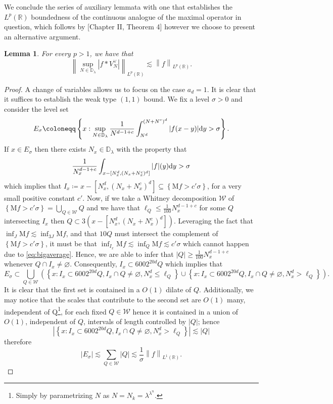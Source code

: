 \documentclass[12pt,leqno]{amsart}
\def\d{{\rm d}}
\def\R {\mathbb{R}}
\newcounter{counter}
\newcounter{counter2}
\numberwithin{equation}{section}
\numberwithin{counter2}{section}
\newcounter{theorem}
\newtheorem{lemma}[subsection]{Lemma}
\theoremstyle{definition}
\theoremstyle{plain}
\begin{document}
	We conclude the series of auxiliary lemmata with one that establishes the $L^p(\R)$ boundedness of the continuous analogue  of the maximal operator in question, which follows by \cite{SteinRealVariableMethods}[Chapter II, Theorem 4] however we choose to present an alternative argument.
	\begin{lemma} \label{l:maxfunctionvariant} For every $p>1$, we have that 
		\[ \left \|  \sup_{N \in \mathbb{D}_{\lambda}} |f* V_N^{\vee}|  \right \|_{L^{p}(\R)} \lesssim \left \| f \right \|_{L^p(\R)}. \] 
	\end{lemma}
	\begin{proof}
		A change of variables allows us to focus on the case $a_d=1.$	It is clear that it suffices to establish the weak type $(1,1)$ bound. We fix a level $\sigma>0$ and consider the level set \[ E_{\sigma} \coloneqq \left\{x : \sup_{N \in \mathbb{D}_{\lambda}} \frac{1}{N^{d-1+c}}\int_{N^d}^{(N+N^c)^d}|f(x-y)| \d y > \sigma   \right\}. \]  If $x \in E_{\sigma}$ then there exists $N_x \in \mathbb{D}_{\lambda}$ with the property that  \begin{equation} \label{eq:bigaverage}
			\frac{1}{N_x^{d-1+c}} \int_{x-[N_x^d,(N_{x}+N_x^{c})^d]}|f|(y) \d y > \sigma
		\end{equation} which implies that $I_x \coloneqq x-[N_x^d,(N_x+N_x^c)^{d}] \subseteq \left\{\mathrm{M}f > c' \sigma \right\}$, for a very small positive constant $c'.$ Now, if we take a Whitney decomposition $\mathcal{W}$ of $\left\{\mathrm{M}f > c'  \sigma\right\}=\bigcup_{Q \in \mathcal{W}}Q$  and we have that $ \ell_Q \leq \frac{1}{100}  N_x^{d-1+c} $ for some $Q  $ intersecting $I_x$ then $Q \subset 3 \left(x-[N_x^d,(N_x+N_x^c)^{d}] \right) $. Leveraging the fact that $\inf_J \mathrm{M}f \lesssim \inf_{3J} \mathrm{M}f$, and that $10Q$ must intersect the complement of $\left\{ \mathrm{M}f >c' \sigma \right\}$, it must be that $ \inf_{I_x} \mathrm{M}f  \lesssim  \inf_Q  \mathrm{M}f \lesssim c'  \sigma  $ which cannot happen due to \eqref{eq:bigaverage}. Hence, we are able to infer that $|Q| \geq \frac{1}{100}N_x^{d-1+c}$ whenever $Q \cap  I_x \neq \varnothing. $ Consequently, $I_x \subset 6002^{20d}Q$ which implies that \[ E_{\sigma} \subset \bigcup_{Q \in \mathcal{W}} \left(\left\{x: I_x \subset 6002^{20d}Q,I_x \cap Q \neq \varnothing, N_x^d \leq \ell_Q   \right\} \cup  \left\{x: I_x \subset 6002^{20d}Q,I_x \cap Q \neq \varnothing, N_x^d > \ell_Q  \right\}\right).    \] It is clear that the first set is contained in a $O(1)$ dilate of $Q$. Additionally,    we may notice that the scales that contribute to the second set are $O(1)$ many, independent of Q\footnote{Simply by parametrizing $N $ as $N=N_k={\lambda}^{\lambda^n}$.},  for each fixed $Q \in \mathcal{W}$ hence it is contained in a union of $O(1)$, independent of $Q$, intervals of length controlled by $|Q|$; hence 
        \[\left|\left\{x: I_x \subset 6002^{20d}Q,I_x \cap Q \neq \varnothing, N_x^d > \ell_Q  \right\}\right|  \lesssim |Q|\] therefore \[ |E_{\sigma}| \lesssim \sum_{Q \in \mathcal{W}}|Q| \lesssim \frac{1}{\sigma}  \left \| f \right \|_{L^1(\R)}. \]
	\end{proof}
\end{document}
